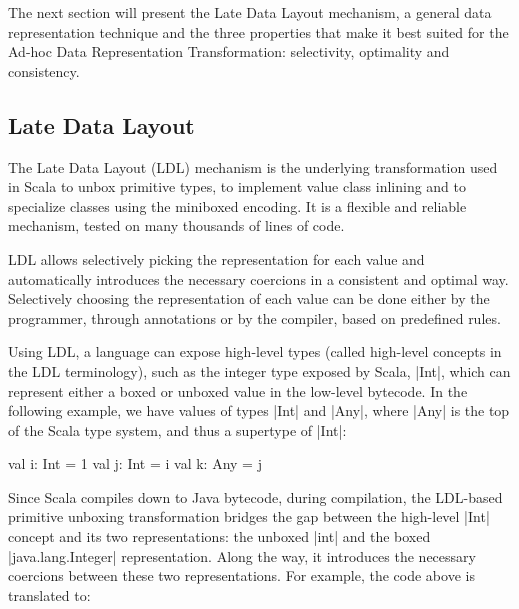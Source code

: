 The next section will present the Late Data Layout mechanism, a general data representation technique and the three properties that make it best suited for the Ad-hoc Data Representation Transformation: selectivity, optimality and consistency.

\subsection{Late Data Layout}

The Late Data Layout (LDL) mechanism is the underlying transformation used in Scala to unbox primitive types, to implement value class inlining and to specialize classes using the miniboxed encoding. It is a flexible and reliable mechanism, tested on many thousands of lines of code. %

LDL allows selectively picking the representation for each value and automatically introduces the necessary coercions in a consistent and optimal way. Selectively choosing the representation of each value can be done either by the programmer, through annotations or by the compiler, based on predefined rules.

Using LDL, a language can expose high-level types (called high-level concepts in the LDL terminology), such as the integer type exposed by Scala, |Int|, which can represent either a boxed or unboxed value in the low-level bytecode. In the following example, we have values of types |Int| and |Any|, where |Any| is the top of the Scala type system, and thus a supertype of |Int|:

\begin{lstlisting-nobreak}
val i: Int = 1
val j: Int = i
val k: Any = j
\end{lstlisting-nobreak}

Since Scala compiles down to Java bytecode, during compilation, the LDL-based primitive unboxing transformation bridges the gap between the high-level |Int| concept and its two representations: the unboxed |int| and the boxed |java.lang.Integer| representation. Along the way, it introduces the necessary coercions between these two representations. For example, the code above is translated to:

